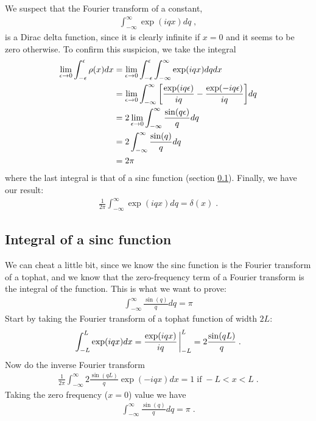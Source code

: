 \documentclass[11pt]{article}
\begin{document}
We suspect that the Fourier transform of a constant,
\begin{align}
\int_{-\infty}^\infty \exp(iqx) dq \;,
\end{align}
is a Dirac delta function, since it is clearly infinite if $x=0$ and it seems to
be zero otherwise.  To confirm this suspicion, we take the integral
\begin{align}
\lim_{\epsilon \rightarrow 0}\int_{-\epsilon}^\epsilon \rho(x)dx &= \lim_{\epsilon \rightarrow 0}\int_{-\epsilon}^\epsilon \int_{-\infty}^\infty \exp(iqx) dq dx \\
&= \lim_{\epsilon \rightarrow 0} \int_{-\infty}^\infty \qty[ \frac{\exp(iq\epsilon)}{iq}  - \frac{\exp(-iq\epsilon)}{iq} ] dq \\
&= 2 \lim_{\epsilon \rightarrow 0} \int_{-\infty}^\infty \frac{\sin(q\epsilon)}{q} dq \\
&= 2 \int_{-\infty}^\infty \frac{\sin(q)}{q} dq \\
&= 2\pi 
\end{align}
where the last integral is that of a sinc function (section \ref{sec:sincint}).
Finally, we have our result:
\begin{align}
\frac{1}{2\pi}\int_{-\infty}^\infty \exp(iqx) dq = \delta(x) \;.
\end{align}


\subsection{Integral of a sinc function}
\label{sec:sincint}

We can cheat a little bit, since we know the sinc function is the Fourier 
transform of a tophat, and we know that the zero-frequency term of a Fourier
transform is the integral of the function.  This is what we want to prove:
\begin{align}
 \int_{-\infty}^\infty \frac{\sin(q)}{q} dq = \pi
\end{align}
Start by taking the Fourier transform of a tophat function of width $2L$:
\begin{align}
 \int_{-L}^{L} \exp(iqx) dx = \frac{\exp(iqx)}{iq}\eval_{-L}^{L} = 2 \frac{\sin(qL)}{q} \;.
\end{align}
Now do the inverse Fourier transform
\begin{align}
\frac{1}{2\pi}\int_{-\infty}^{\infty} 2 \frac{\sin(qL)}{q} \exp(-iqx) dx = 1 \; \text{if} \; -L < x < L \;.
\end{align}
Taking the zero frequency ($x=0$) value we have
\begin{align}
\int_{-\infty}^{\infty} \frac{\sin(q)}{q} dq = \pi \;.
\end{align}

\newpage



\end{document}
